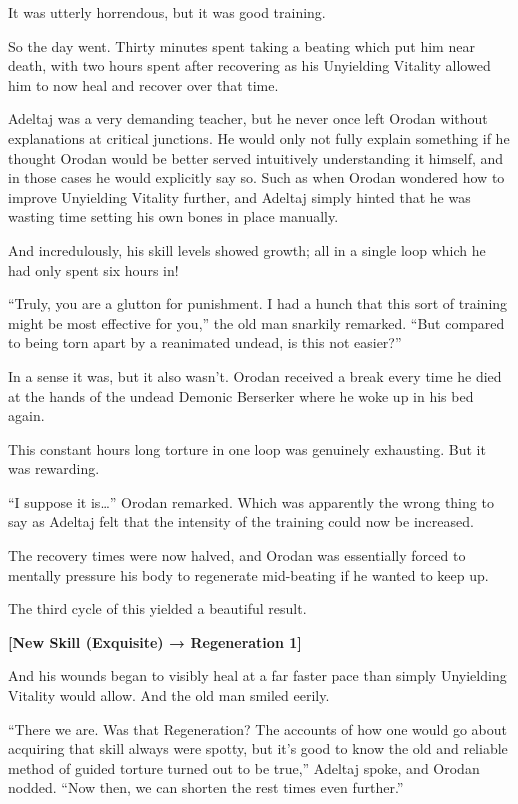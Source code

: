 \documentclass[a4paper,10pt]{book}
\begin{document}
It was utterly horrendous, but it was good training.\par
So the day went. Thirty minutes spent taking a beating which put him near death, with two hours spent after recovering as his Unyielding Vitality allowed him to now heal and recover over that time.\par
Adeltaj was a very demanding teacher, but he never once left Orodan without explanations at critical junctions. He would only not fully explain something if he thought Orodan would be better served intuitively understanding it himself, and in those cases he would explicitly say so. Such as when Orodan wondered how to improve Unyielding Vitality further, and Adeltaj simply hinted that he was wasting time setting his own bones in place manually.\par
And incredulously, his skill levels showed growth; all in a single loop which he had only spent six hours in!\par
“Truly, you are a glutton for punishment. I had a hunch that this sort of training might be most effective for you,” the old man snarkily remarked. “But compared to being torn apart by a reanimated undead, is this not easier?”\par
In a sense it was, but it also wasn’t. Orodan received a break every time he died at the hands of the undead Demonic Berserker where he woke up in his bed again.\par
This constant hours long torture in one loop was genuinely exhausting. But it was rewarding.\par
“I suppose it is…” Orodan remarked. Which was apparently the wrong thing to say as Adeltaj felt that the intensity of the training could now be increased.\par
The recovery times were now halved, and Orodan was essentially forced to mentally pressure his body to regenerate mid-beating if he wanted to keep up.\par
The third cycle of this yielded a beautiful result.\par
\textbf{[New Skill (Exquisite) → Regeneration 1]}\par
And his wounds began to visibly heal at a far faster pace than simply Unyielding Vitality would allow. And the old man smiled eerily.\par
“There we are. Was that Regeneration? The accounts of how one would go about acquiring that skill always were spotty, but it’s good to know the old and reliable method of guided torture turned out to be true,” Adeltaj spoke, and Orodan nodded. “Now then, we can shorten the rest times even further.”\par
\end{document}
